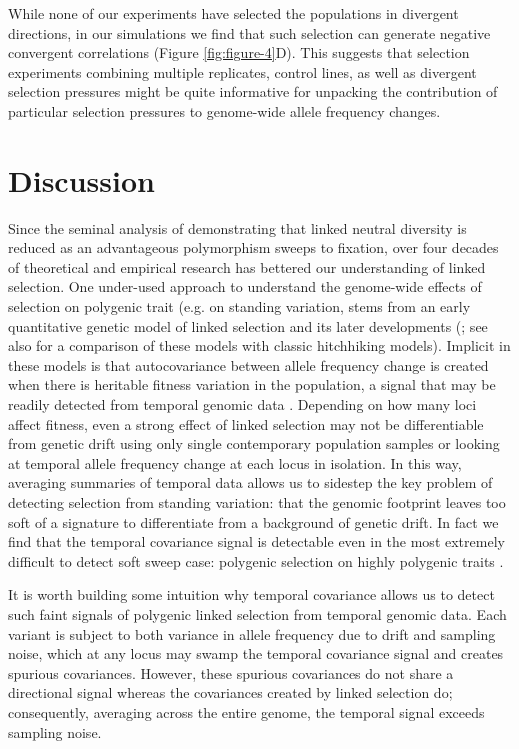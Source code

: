 \documentclass[11pt]{article}
\begin{document}
While none of our experiments have selected the populations in divergent
directions, in our simulations we find that such selection can generate
negative convergent correlations (Figure \ref{fig:figure-4}D). This suggests
that selection experiments combining multiple replicates, control lines, as
well as divergent selection pressures might be quite informative for unpacking
the contribution of particular selection pressures to genome-wide allele
frequency changes.

\section{Discussion}

Since the seminal analysis of \textcite{Maynard_Smith1974-lc} demonstrating
that linked neutral diversity is reduced as an advantageous polymorphism sweeps
to fixation, over four decades of theoretical and empirical research has
bettered our understanding of linked selection.  One under-used approach to
understand the genome-wide effects of selection on polygenic trait (e.g.  on
standing variation, stems from an early quantitative genetic model of linked
selection \parencite{Robertson1961-ho} and its later developments
(\cite{Santiago1995-hx,Santiago1998-bs,Wray1990-zf,Woolliams1993-qo}; see also
\cite{Barton2000-zg} for a comparison of these models with classic hitchhiking
models). Implicit in these models is that autocovariance between allele
frequency change is created when there is heritable fitness variation in the
population, a signal that may be readily detected from temporal genomic data
\parencite{Buffalo2019-io}.  Depending on how many loci affect fitness,
even a strong effect of linked selection may not be differentiable from
genetic drift using only single contemporary population samples or looking 
at temporal allele frequency change at each locus in isolation. In this way,
averaging summaries of temporal data allows us to sidestep the key problem of
detecting selection from standing variation: that the genomic footprint leaves
too soft of a signature to differentiate from a background of genetic drift. In
fact we find that the temporal covariance signal is detectable even in the most
extremely difficult to detect soft sweep case: polygenic selection on highly
polygenic traits \parencite{Buffalo2019-io}.

It is worth building some intuition why temporal covariance allows us to detect
such faint signals of polygenic linked selection from temporal genomic data.
Each variant is subject to both variance in allele frequency due to drift and
sampling noise, which at any locus may swamp the temporal covariance signal and
creates spurious covariances. However, these spurious covariances do not share
a directional signal whereas the covariances created by linked selection do;
consequently, averaging across the entire genome, the temporal signal exceeds
sampling noise. 
\end{document}
